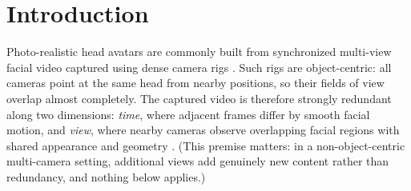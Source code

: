 
%
%
%
%
%

\section{Introduction}

Photo-realistic head avatars are commonly built from synchronized multi-view facial video captured using dense camera rigs \cite{lombardi2018deep, lombardi2021mixture, cao2022authentic,
kirschstein2023nersemble, qian2024gaussianavatars}. Such rigs are object-centric: all cameras point at the same head from nearby positions, so their fields of view overlap almost completely. The captured video is therefore strongly redundant along two dimensions: \emph{time}, where adjacent frames differ by smooth facial motion, and \emph{view}, where nearby cameras observe overlapping facial regions with shared appearance and geometry \cite{taubner2025mvp4d, shah2024mv2mae}. (This premise matters: in a non-object-centric multi-camera setting, additional views add genuinely new content rather than redundancy, and nothing below applies.)


